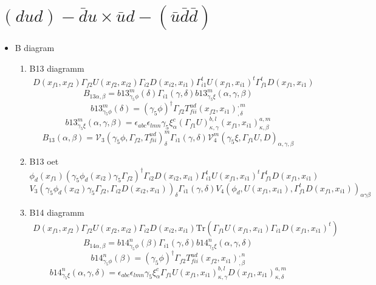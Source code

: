 \documentclass{article}[12pt]
\begin{document}
\section{$(dud)-\bar{d}u \times \bar{u}d-(\bar{u}\bar{d}\bar{d}) $}
\begin{itemize}
\item B diagram
\begin{enumerate}
\item B13 diagramm
\begin{eqnarray}
D(x_{f1},x_{f2})\Gamma_{f2}U(x_{f2},x_{i2})\Gamma_{i2}D(x_{i2},x_{i1})\Gamma_{i1}^tU(x_{f1},x_{i1})^t\Gamma_{f1}^tD(x_{f1},x_{i1}) 
\end{eqnarray}
$$
B_{13\alpha,\beta}=b13_{\gamma_5\phi}^{m}\left(\delta\right)\Gamma_{i1}\left(\gamma,\delta\right)b13_{\gamma_5\xi}^{m}\left(\alpha,\gamma,\beta\right)
$$
$$
b13_{\gamma_5\phi}^{m}\left(\delta\right)=(\gamma_5\phi)^{\dagger}\Gamma_{f2}T_{fii}^{ud}\left(x_{f2},x_{i1}\right)^{,m}_{,\delta}
$$
$$
b13_{\gamma_5\xi}^{m}\left(\alpha,\gamma,\beta\right)=\epsilon_{abc}\epsilon_{lmn}\gamma_5\xi^{c}_{\alpha}\left(\Gamma_{f1}U\right)_{\kappa,\gamma}^{b,l}\left(x_{f1},x_{i1}\right)_{\kappa,\beta}^{a,m}
$$
$$
B_{13}\left(\alpha,\beta\right)={\mathcal V}_{3}\left(\gamma_5\phi,\Gamma_{f2},T_{fii}^{ud}\right)^{m}_{\delta}\Gamma_{i1}\left(\gamma,\delta\right){\mathcal V}^{m}_{4}\left(\gamma_5\xi,\Gamma_{f1}U,D\right)_{\alpha,\gamma,\beta}
$$
\item B13 oet
$$
\phi_d(x_{f1})(\gamma_5\phi_d(x_{i2})\gamma_5\Gamma_{f2})^{\dagger}\Gamma_{i2}D(x_{i2},x_{i1})\Gamma_{i1}^t U(x_{f1},x_{i1})^t\Gamma_{f1}^t D(x_{f1},x_{i1})
$$
$$
V_3(\gamma_5\phi_d(x_{i2})\gamma_5\Gamma_{f2},\Gamma_{i2}D(x_{i2},x_{i1}))_{\delta}\Gamma_{i1}(\gamma,\delta)V_4(\phi_d,U(x_{f1},x_{i1}),\Gamma_{f1}^tD(x_{f1},x_{i1}))_{\alpha\gamma\beta}
$$
\item B14 diagramm
\begin{eqnarray}
D(x_{f1},x_{f2})\Gamma_{f2}U(x_{f2},x_{i2})\Gamma_{i2}D(x_{i2},x_{i1})\mathrm{Tr}(\Gamma_{f1}U(x_{f1},x_{i1})\Gamma_{i1}D(x_{f1},x_{i1})^t)
\end{eqnarray}
$$
B_{14\alpha,\beta}=b14_{\gamma_5\phi}^{n}\left(\beta\right)\Gamma_{i1}\left(\gamma,\delta\right)b14_{\gamma_5\xi}^{n}\left(\alpha,\gamma,\delta\right)
$$
$$
b14_{\gamma_5\phi}^{n}\left(\beta\right)=(\gamma_5\phi)^{\dagger}\Gamma_{f2}T_{fii}^{ud}\left(x_{f2},x_{i1}\right)^{,n}_{,\beta}
$$
$$
b14_{\gamma_5\xi}^{n}\left(\alpha,\gamma,\delta\right)=\epsilon_{abc}\epsilon_{lmn}\gamma_5\xi^{c}_\alpha \Gamma_{f1}U\left(x_{f1},x_{i1}\right)^{b,l}_{\kappa,\gamma}D\left(x_{f1},x_{i1}\right)^{a,m}_{\kappa,\delta}
$$
\end{enumerate}
\end{itemize}
\end{document}
